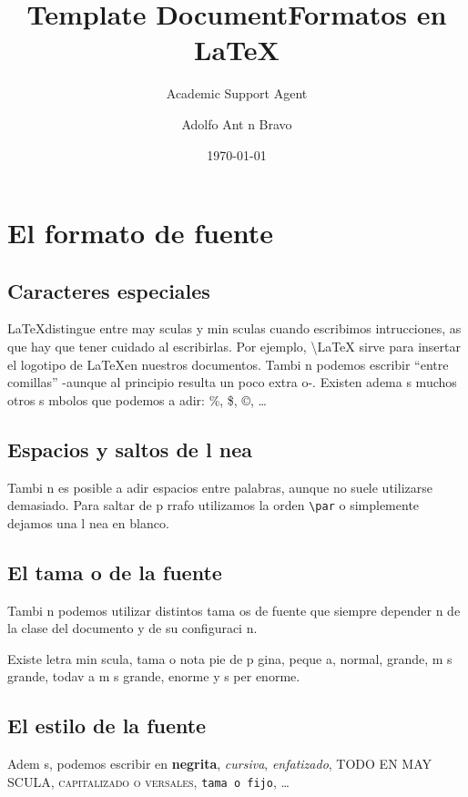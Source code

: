\documentclass{article}
\title{Template Document}
\author{Academic Support Agent}
\date{\today}
\begin{document}
\maketitle

\title{Formatos en \LaTeX}
\author{Adolfo Ant n Bravo}
\maketitle{}
\section{El formato de fuente}
\label{sec:formato}

\subsection{Caracteres especiales}
\label{sec:caracteres}
\LaTeX distingue entre may sculas y min sculas cuando escribimos intrucciones, as  que hay que tener cuidado al escribirlas. Por ejemplo, \textbackslash LaTeX sirve para insertar el logotipo de \LaTeX en nuestros documentos.
Tambi n podemos escribir ``entre comillas'' -aunque al principio resulta un poco extra o-. Existen adema s muchos otros s mbolos que podemos a adir: \%, \$, \copyright, \ldots

\subsection{Espacios y saltos de l nea}
\label{sec:espacioslinea}

Tambi n es posible a adir espacios \hspace{2cm} entre palabras, aunque no suele utilizarse demasiado.
Para saltar de p rrafo utilizamos la orden \texttt{\textbackslash par} o simplemente dejamos una l nea en blanco.

\subsection{El tama o de la fuente}
\label{sec:fuente}

Tambi n podemos utilizar distintos tama os de fuente que siempre depender n de la clase del documento y de su configuraci n.

Existe letra \tiny min scula, \scriptsize tama o nota \footnotesize pie de p gina, \small peque a, \normalsize normal, \large grande, \Large m s grande, \LARGE todav a m s grande, \huge enorme y \Huge s per enorme. 

\subsection{El estilo de la fuente}
\label{sec:estilo}
\normalsize
Adem s, podemos escribir en \textbf{negrita}, \textit{cursiva}, \emph{enfatizado}, \uppercase{todo en may scula}, \textsc{capitalizado o versales}, \texttt{tama o fijo}, \ldots
\end{document}
